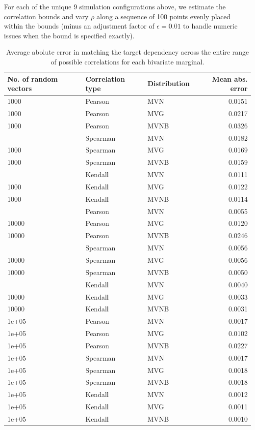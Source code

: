 \documentclass[]{article}
\begin{document}
For each of the unique 9 simulation configurations above, we estimate the correlation bounds and vary \(\rho\) along a sequence of 100 points evenly placed within the bounds (minus an adjustment factor of \(\epsilon=0.01\) to handle numeric issues when the bound is specified exactly).

\begin{table}

\caption{\label{tab:ch040-biMAEtable}Average abolute error in matching the target dependency across the entire range of possible correlations for each bivariate marginal.}
\centering
\begin{tabular}[t]{lllr}
\toprule
No. of random vectors & Correlation type & Distribution & Mean abs. error\\
\midrule
1000 & Pearson & MVN & 0.0151\\
1000 & Pearson & MVG & 0.0217\\
1000 & Pearson & MVNB & 0.0326\\
\addlinespace
1000 & Spearman & MVN & 0.0182\\
1000 & Spearman & MVG & 0.0169\\
1000 & Spearman & MVNB & 0.0159\\
\addlinespace
1000 & Kendall & MVN & 0.0111\\
1000 & Kendall & MVG & 0.0122\\
1000 & Kendall & MVNB & 0.0114\\
\addlinespace
10000 & Pearson & MVN & 0.0055\\
10000 & Pearson & MVG & 0.0120\\
10000 & Pearson & MVNB & 0.0246\\
\addlinespace
10000 & Spearman & MVN & 0.0056\\
10000 & Spearman & MVG & 0.0056\\
10000 & Spearman & MVNB & 0.0050\\
\addlinespace
10000 & Kendall & MVN & 0.0040\\
10000 & Kendall & MVG & 0.0033\\
10000 & Kendall & MVNB & 0.0031\\
\addlinespace
1e+05 & Pearson & MVN & 0.0017\\
1e+05 & Pearson & MVG & 0.0102\\
1e+05 & Pearson & MVNB & 0.0227\\
\addlinespace
1e+05 & Spearman & MVN & 0.0017\\
1e+05 & Spearman & MVG & 0.0018\\
1e+05 & Spearman & MVNB & 0.0018\\
\addlinespace
1e+05 & Kendall & MVN & 0.0012\\
1e+05 & Kendall & MVG & 0.0011\\
1e+05 & Kendall & MVNB & 0.0010\\
\bottomrule
\end{tabular}
\end{table}
\end{document}
